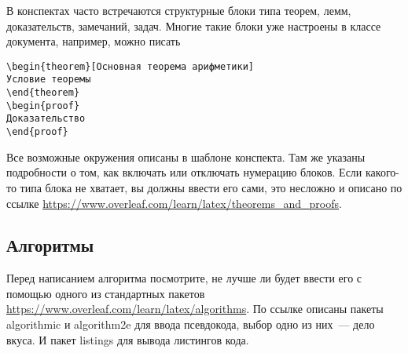 \documentclass{article}
\begin{document}
    В конспектах часто встречаются структурные блоки типа теорем, лемм, доказательств, замечаний, задач.
    Многие такие блоки уже настроены в классе документа, например, можно писать
    \begin{verbatim}
\begin{theorem}[Основная теорема арифметики]
Условие теоремы
\end{theorem}
\begin{proof}
Доказательство
\end{proof}
    \end{verbatim}
    Все возможные окружения описаны в шаблоне конспекта.
    Там же указаны подробности о том, как включать или отключать нумерацию блоков.
    Если какого-то типа блока не хватает, вы должны ввести его сами, это несложно и описано по ссылке \url{https://www.overleaf.com/learn/latex/theorems_and_proofs}.

    \subsection{Алгоритмы}
    Перед написанием алгоритма посмотрите, не лучше ли будет ввести его с помощью одного из стандартных пакетов
    \url{https://www.overleaf.com/learn/latex/algorithms}. По ссылке описаны пакеты algorithmic и algorithm2e для
    ввода псевдокода, выбор одно из них~--- дело вкуса. И пакет listings для вывода листингов кода.
\end{document}

